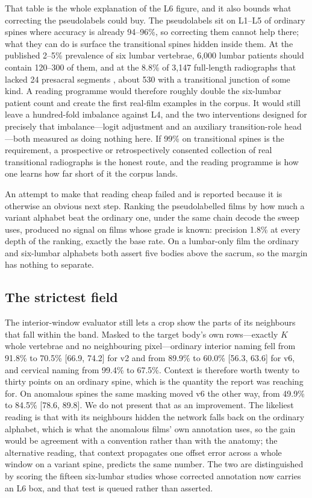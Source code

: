 \documentclass[11pt,letterpaper]{article}
\newcommand{\ci}[2]{[#1, #2]}
\begin{document}
That table is the whole explanation of the L6 figure, and it also bounds what correcting the pseudolabels could buy. The pseudolabels sit on L1--L5 of ordinary spines where accuracy is already 94--96\%, so correcting them cannot help there; what they can do is surface the transitional spines hidden inside them. At the published 2--5\% prevalence of six lumbar vertebrae, 6,000 lumbar patients should contain 120--300 of them, and at the 8.8\% of 3,147 full-length radiographs that lacked 24 presacral segments \citep{sabri2025}, about 530 with a transitional junction of some kind. A reading programme would therefore roughly double the six-lumbar patient count and create the first real-film examples in the corpus. It would still leave a hundred-fold imbalance against L4, and the two interventions designed for precisely that imbalance---logit adjustment and an auxiliary transition-role head---both measured as doing nothing here. If 99\% on transitional spines is the requirement, a prospective or retrospectively consented collection of real transitional radiographs is the honest route, and the reading programme is how one learns how far short of it the corpus lands.

An attempt to make that reading cheap failed and is reported because it is otherwise an obvious next step. Ranking the pseudolabelled films by how much a variant alphabet beat the ordinary one, under the same chain decode the sweep uses, produced no signal on films whose grade is known: precision 1.8\% at every depth of the ranking, exactly the base rate. On a lumbar-only film the ordinary and six-lumbar alphabets both assert five bodies above the sacrum, so the margin has nothing to separate.

\subsection*{The strictest field}
The interior-window evaluator still lets a crop show the parts of its neighbours that fall within the band. Masked to the target body's own rows---exactly $K$ whole vertebrae and no neighbouring pixel---ordinary interior naming fell from 91.8\% to 70.5\% \ci{66.9}{74.2} for v2 and from 89.9\% to 60.0\% \ci{56.3}{63.6} for v6, and cervical naming from 99.4\% to 67.5\%. Context is therefore worth twenty to thirty points on an ordinary spine, which is the quantity the report was reaching for. On anomalous spines the same masking moved v6 the other way, from 49.9\% to 84.5\% \ci{78.6}{89.8}. We do not present that as an improvement. The likeliest reading is that with its neighbours hidden the network falls back on the ordinary alphabet, which is what the anomalous films' own annotation uses, so the gain would be agreement with a convention rather than with the anatomy; the alternative reading, that context propagates one offset error across a whole window on a variant spine, predicts the same number. The two are distinguished by scoring the fifteen six-lumbar studies whose corrected annotation now carries an L6 box, and that test is queued rather than asserted.
\end{document}
